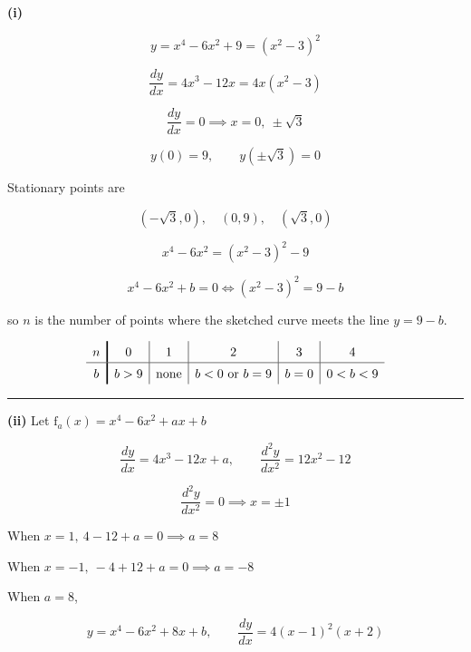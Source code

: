 \documentclass[12pt]{article}
\begin{document}
\newcommand{\ds}{\displaystyle}

\textbf{(i)}

$$y=x^4-6x^2+9=(x^2-3)^2$$

$$\frac{dy}{dx}=4x^3-12x=4x(x^2-3)$$

$$\frac{dy}{dx}=0\implies x=0,\ \pm\sqrt3$$

$$y(0)=9,\qquad y(\pm\sqrt3)=0$$

Stationary points are

$$(-\sqrt3,0),\quad (0,9),\quad (\sqrt3,0)$$

\begin{center}
\end{center}

$$x^4-6x^2=(x^2-3)^2-9$$

$$x^4-6x^2+b=0\iff \left(x^2-3\right)^2=9-b$$

so $n$ is the number of points where the sketched curve meets the line $y=9-b$.

$$
\renewcommand{\arraystretch}{1.4}
\begin{array}{c!{\vrule width 1.2pt}c|c|c|c|c}
n & 0 & 1 & 2 & 3 & 4\\
\hline
\rule[-4pt]{0pt}{14pt}
b & b>9 & \text{none} & b<0\text{ or }b=9 & b=0 & 0<b<9
\end{array}
$$

\bigskip\hrule\bigskip

\textbf{(ii)} Let $\ds \mathrm{f}_a(x)=x^4-6x^2+ax+b$

$$\frac{dy}{dx}=4x^3-12x+a,\qquad \frac{d^2y}{dx^2}=12x^2-12$$

$$\frac{d^2y}{dx^2}=0\implies x=\pm1$$

When $\ds x=1,\ 4-12+a=0\implies a=8$

When $\ds x=-1, \ -4+12+a=0\implies a=-8$

When $a=8$,

$$y=x^4-6x^2+8x+b,\qquad \frac{dy}{dx}=4(x-1)^2(x+2)$$
\end{document}
